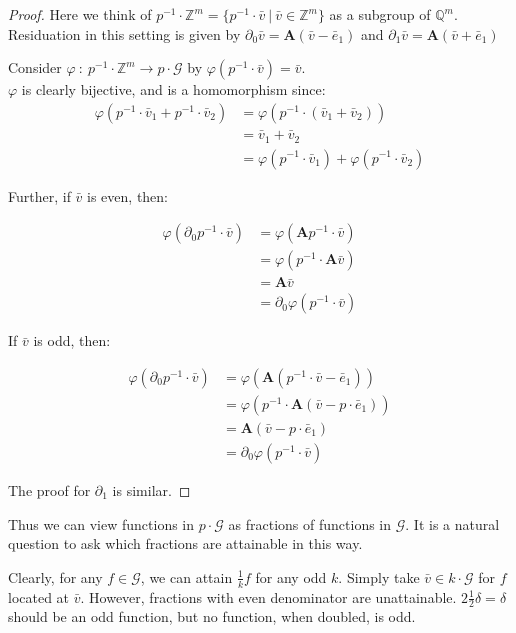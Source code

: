 \documentclass[runningheads]{llncs}
\newcommand{\G}{\mathcal{G}}
\newcommand{\Z}{\mathbb{Z}}
\newcommand{\Q}{\mathbb{Q}}
\newcommand{\2}{\textbf{2}}
\newcommand{\Am}{\textbf{A}}
\newcommand{\del}{\partial}
\renewcommand{\v}{\bar{v}}
\newcommand{\e}{\bar{e}}
\begin{document}
\begin{proof}
  Here we think of $p^{-1} \cdot \Z^m = \{ p^{-1} \cdot \v~|~\v \in \Z^m \}$
  as a subgroup of $\Q^m$. Residuation in this setting is given by
  $\del_0 \v = \Am (\v - \e_1)$ and $\del_1 \v = \Am (\v + \e_1)$ 

  Consider $\varphi~:~p^{-1} \cdot \Z^m \to p \cdot \G$ by
  $\varphi(p^{-1} \cdot \v) = \v$.\\
  $\varphi$ is clearly bijective, and is a homomorphism since:
  \begin{align*}
       \varphi(p^{-1} \cdot \v_1 + p^{-1} \cdot \v_2) 
    &= \varphi(p^{-1} \cdot (\v_1 + \v_2))\\
    &= \v_1 + \v_2\\
    &= \varphi(p^{-1} \cdot \v_1) + \varphi(p^{-1} \cdot \v_2) 
  \end{align*}

  Further, if $\v$ is even, then:

  \begin{align*}
       \varphi(\del_0 p^{-1} \cdot \v)
    &= \varphi(\Am p^{-1} \cdot \v)\\
    &= \varphi(p^{-1} \cdot \Am \v)\\
    &= \Am \v\\
    &= \del_0 \varphi(p^{-1} \cdot \v)
  \end{align*}

  If $\v$ is odd, then: 

  \begin{align*}
       \varphi(\del_0 p^{-1} \cdot \v)
    &= \varphi(\Am (p^{-1} \cdot \v - \e_1))\\
    &= \varphi(p^{-1} \cdot \Am (\v - p \cdot \e_1))\\
    &= \Am (\v - p \cdot \e_1)\\
    &= \del_0 \varphi(p^{-1} \cdot \v)
  \end{align*}

  The proof for $\del_1$ is similar.
\end{proof}

Thus we can view functions in $p \cdot \G$ as fractions of functions in $\G$.
It is a natural question to ask which fractions are attainable in this way.

Clearly, for any $f \in \G$, we can attain $\frac{1}{k} f$ for any odd $k$.
Simply take $\v \in k \cdot \G$ for $f$ located at $\v$.
However, fractions with even denominator are unattainable.
$2 \frac{1}{2}\delta = \delta$ should be an odd function,
but no function, when doubled, is odd.
\end{document}
